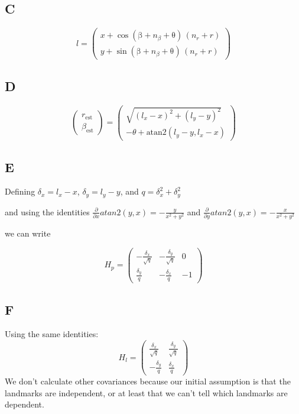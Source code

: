 \documentclass[letterpaper]{article}
\begin{document}
\subsection*{C}
$$
l = \left(\begin{array}{c} x+\cos\left(\mathrm{\beta}+n_{\beta }+\mathrm{\theta}\right)\,\left(n_{r}+r\right)\\ y+\sin\left(\mathrm{\beta}+n_{\beta }+\mathrm{\theta}\right)\,\left(n_{r}+r\right) \end{array}\right) 
$$
\subsection*{D}
$$
\left(\begin{array}{c} r_{\mathrm{est}}\\ \beta _{\mathrm{est}} \end{array}\right)
=
\left(\begin{array}{c} \sqrt{{\left(l_{x}-x\right)}^2+{\left(l_{y}-y\right)}^2}\\ -\theta+\text{atan2}\left(l_{y}-y,l_{x}-x\right) \end{array}\right)
$$
\subsection*{E}
Defining $\delta_x = l_x - x$, $\delta_y = l_y - y$, and $q = \delta_x^2 + \delta_y^2$


and using the identities $\frac{\partial}{\partial x}atan2(y,x) = -\frac{y}{x^2+y^2}$ and $\frac{\partial}{\partial y}atan2(y,x) = -\frac{x}{x^2+y^2}$ 

we can write 

$$
H_p = \left(\begin{array}{ccc} -\frac{\delta _{x}}{\sqrt{q}} & -\frac{\delta _{y}}{\sqrt{q}} & 0\\ \frac{\delta _{y}}{q} & -\frac{\delta _{x}}{q} & -1 \end{array}\right)
$$

\subsection*{F}
Using the same identities: 
$$
H_l =\left(\begin{array}{cc} \frac{\delta _{x}}{\sqrt{q}} & \frac{\delta _{y}}{\sqrt{q}}\\ -\frac{\delta _{y}}{q} & \frac{\delta _{x}}{q} \end{array}\right) 
$$
We don't calculate other covariances because our initial assumption is that the landmarks are independent, or at least
that we can't tell which landmarks are dependent.
\end{document}
